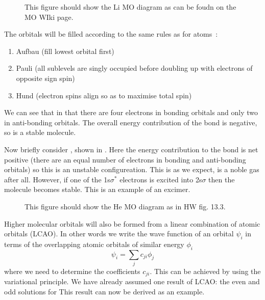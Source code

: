 \begin{figure}
  \caption{This figure should show the Li MO diagram as can be foudn on the MO
  WIki page.}
  \label{diaspec:fig:LiMO}
\end{figure}

The orbitals will be filled according to the same rules as for atoms~\cite{}:
%
\begin{enumerate}
  \item Aufbau (fill lowest orbital first)
  \item Pauli (all sublevels are singly occupied before doubling up with
    electrons of opposite sign spin)
  \item Hund (electron spins align so as to maximise total spin)
\end{enumerate}
%
We can see that in  that there are four electrons in bonding orbitals
and only two in anti-bonding orbitals. The overall energy contribution of the
bond is negative, so   is a stable molecule.

Now briefly consider , shown in . Here the
energy contribution to the bond is net positive (there are an equal number of
electrons in bonding and anti-bonding orbitals) so this is an unstable
configureation. This is as we expect,  is a noble gas after all. However,
if one of the 1s$\sigma^*$ electrons is excited into 2s$\sigma$ then the
 molecule becomes stable. This is an example of an excimer.

\begin{figure}
  \caption{This figure should show the He MO diagram as in HW fig. 13.3.}
  \label{diaspec:fig:HeMO}
\end{figure}


Higher molecular orbitals will also be formed from a linear combination of
atomic orbitals (LCAO). In other words we write the wave function of an orbital
$\psi_i$ in terms of the overlapping atomic orbitals of similar energy $\phi_i$
%
\begin{equation}
  \psi_i = \sum_j c_{ji} \phi_j
\end{equation}
%
where we need to determine the coefficients $c_{ji}$. This can be achieved by
using the variational principle. We have already assumed one result of LCAO: the
even and odd solutions for   This result can now be
derived as an example.



